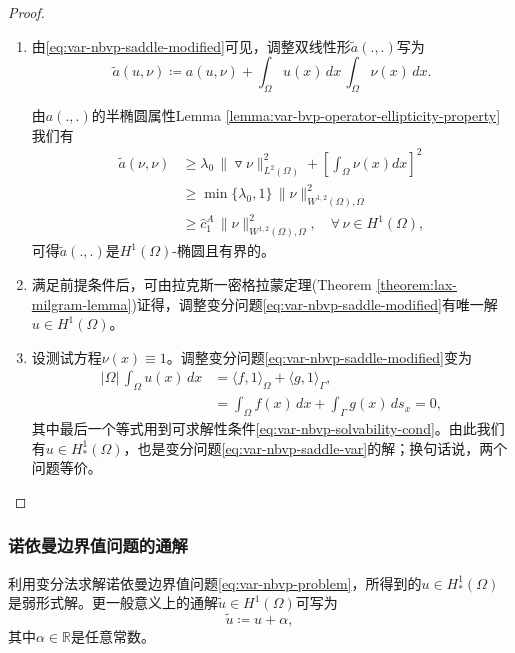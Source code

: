 \begin{proof}
  \begin{enumerate}
  \item 由\eqref{eq:var-nbvp-saddle-modified}可见，调整双线性形$\widetilde{a}(.,.)$写为
  \begin{equation*}
    \widetilde{a}(u,\nu) \coloneqq a(u,\nu) + \int_{\Omega} u(x) \, dx \, \int_{\Omega} \nu(x) \, dx.
  \end{equation*}

  由$a(.,.)$的半椭圆属性Lemma \ref{lemma:var-bvp-operator-ellipticity-property}我们有
  \begin{equation}
    \label{eq:var-nbvp-modified-ellipticity}
  \begin{split}
      \widetilde{a}(\nu,\nu) &\ge \lambda_0 \, \big\| \triangledown \nu \big\|_{L^{2}(\Omega)}^2 + \left[ \int_{\Omega} \nu(x) dx \right]^2\\
      &\ge \min\{\lambda_0, 1\} \, \big\| \nu \big\|_{W^{1,2}(\Omega), \Omega}^2 \\
      & \ge \hat{c}_1^A \, \big\| \nu \big\|_{W^{1,2}(\Omega), \Omega}^2, \quad \forall \, \nu \in H^{1}(\Omega),
  \end{split}
  \end{equation}
  可得$\widetilde{a}(.,.)$是$H^{1}(\Omega)$-椭圆且有界的。

  \item 满足前提条件后，可由拉克斯一密格拉蒙定理(Theorem \ref{theorem:lax-milgram-lemma})证得，调整变分问题\eqref{eq:var-nbvp-saddle-modified}有唯一解$u \in H^{1}(\Omega)$。

  \item 设测试方程$\nu(x) \equiv 1$。调整变分问题\eqref{eq:var-nbvp-saddle-modified}变为
  \begin{equation*}
    \begin{split}
      \big| \Omega \big| \, \int_{\Omega} u(x) \, dx &=
      \langle f, 1 \rangle_{\Omega}
      + \langle g, 1 \rangle_{\Gamma}, \\
      & = \int_{\Omega} f(x) \, d x + \int_{\Gamma} g(x) \, d s_x = 0,
    \end{split}
  \end{equation*}
  其中最后一个等式用到可求解性条件\eqref{eq:var-nbvp-solvability-cond}。由此我们有$u \in H_{*}^{1}(\Omega)$，也是变分问题\eqref{eq:var-nbvp-saddle-var}的解；换句话说，两个问题等价。
\end{enumerate}
\end{proof}

\subsubsection{诺依曼边界值问题的通解}
利用变分法求解诺依曼边界值问题\eqref{eq:var-nbvp-problem}，所得到的$u \in H_{*}^{1}(\Omega)$是弱形式解。更一般意义上的通解$\widetilde{u} \in H^{1}(\Omega)$可写为
\begin{equation*}
  \widetilde{u} \coloneqq u + \alpha,
\end{equation*}
其中$\alpha \in \mathbb{R}$是任意常数。
